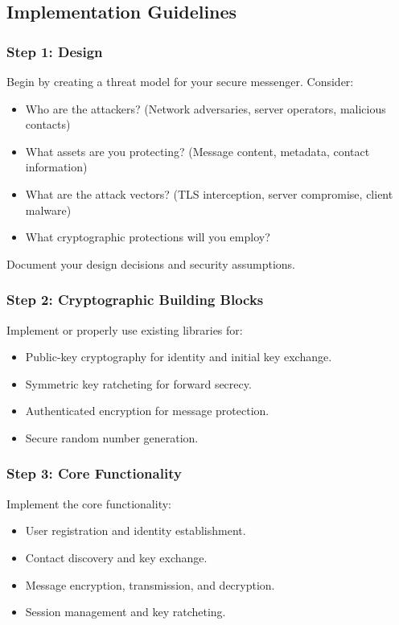 \documentclass[10pt,a4paper,american]{exam}
\begin{document}
\subsection*{Implementation Guidelines}

\subsubsection*{Step 1: Design}
Begin by creating a threat model for your secure messenger. Consider:
\begin{itemize}
	\item Who are the attackers? (Network adversaries, server operators, malicious contacts)
	\item What assets are you protecting? (Message content, metadata, contact information)
	\item What are the attack vectors? (TLS interception, server compromise, client malware)
	\item What cryptographic protections will you employ?
\end{itemize}

Document your design decisions and security assumptions.

\subsubsection*{Step 2: Cryptographic Building Blocks}
Implement or properly use existing libraries for:
\begin{itemize}
	\item Public-key cryptography for identity and initial key exchange.
	\item Symmetric key ratcheting for forward secrecy.
	\item Authenticated encryption for message protection.
	\item Secure random number generation.
\end{itemize}

\subsubsection*{Step 3: Core Functionality}
Implement the core functionality:
\begin{itemize}
	\item User registration and identity establishment.
	\item Contact discovery and key exchange.
	\item Message encryption, transmission, and decryption.
	\item Session management and key ratcheting.
\end{itemize}
\end{document}
